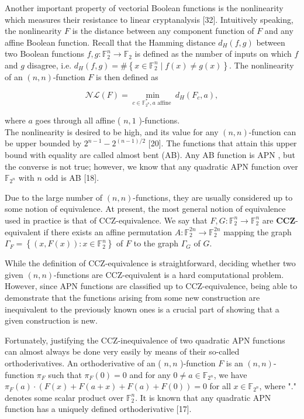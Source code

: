 \documentclass[10pt]{article}
\begin{document}
Another important property of vectorial Boolean functions is the nonlinearity which measures their resistance to linear cryptanalysis [32]. Intuitively speaking, the nonlinearity $F$ is the distance between any component function of $F$ and any affine Boolean function. Recall that the Hamming distance $d_{H}(f, g)$ between two Boolean functions $f, g: \mathbb{F}_{2}^{n} \rightarrow \mathbb{F}_{2}$ is defined as the number of inputs on which $f$ and $g$ disagree, i.e. $d_{H}(f, g)=\#\left\{x \in \mathbb{F}_{2}^{n} \mid f(x) \neq g(x)\right\}$. The nonlinearity of an $(n, n)$-function $F$ is then defined as

$$
\mathcal{N} \mathcal{L}(F)=\min _{c \in \mathbb{F}_{2^{n}}^{*}, a \text { affine }} d_{H}\left(F_{c}, a\right),
$$

where $a$ goes through all affine ( $n, 1$ )-functions.\\
The nonlinearity is desired to be high, and its value for any $(n, n)$-function can be upper bounded by $2^{n-1}-2^{(n-1) / 2}$ [20]. The functions that attain this upper bound with equality are called almost bent (AB). Any AB function is APN , but the converse is not true; however, we know that any quadratic APN function over $\mathbb{F}_{2^{n}}$ with $n$ odd is AB [18].

Due to the large number of $(n, n)$-functions, they are usually considered up to some notion of equivalence. At present, the most general notion of equivalence used in practice is that of CCZ-equivalence. We say that $F, G: \mathbb{F}_{2}^{n} \rightarrow \mathbb{F}_{2}^{n}$ are $\mathbf{C C Z}$-equivalent if there exists an affine permutation $A: \mathbb{F}_{2}^{2 n} \rightarrow \mathbb{F}_{2}^{2 n}$ mapping the graph $\Gamma_{F}=\left\{(x, F(x)): x \in \mathbb{F}_{2}^{n}\right\}$ of $F$ to the graph $\Gamma_{G}$ of $G$.

While the definition of CCZ-equivalence is straightforward, deciding whether two given $(n, n)$-functions are CCZ-equivalent is a hard computational problem. However, since APN functions are classified up to CCZ-equivalence, being able to demonstrate that the functions arising from some new construction are inequivalent to the previously known ones is a crucial part of showing that a given construction is new.

Fortunately, justifying the CCZ-inequivalence of two quadratic APN functions can almost always be done very easily by means of their so-called orthoderivatives. An orthoderivative of an ( $n, n$ )-function $F$ is an $(n, n)$-function $\pi_{F}$ such that $\pi_{F}(0)=0$ and for any $0 \neq a \in \mathbb{F}_{2^{n}}$, we have $\pi_{F}(a) \cdot(F(x)+F(a+x)+ F(a)+F(0))=0$ for all $x \in \mathbb{F}_{2^{n}}$, where "." denotes some scalar product over $\mathbb{F}_{2}^{n}$. It is known that any quadratic APN function has a uniquely defined orthoderivative [17].
\end{document}

